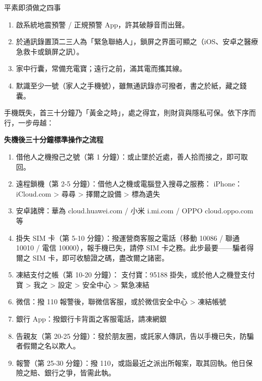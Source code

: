 \begin{tcbpractice}{平素即須做之四事}
\begin{enumerate}
  \item 啟系統地震預警 / 正規預警 App，許其破靜音而出聲。
  \item 於通訊錄置頂二三人為「緊急聯絡人」，鎖屏之界面可顯之（iOS、安卓之醫療急救卡或鎖屏之訊）。
  \item 家中行囊，常備充電寶；遠行之前，滿其電而攜其線。
  \item 默識至少一號（家人之手機號），雖無通訊錄亦可撥者，書之於紙，藏之錢囊。
\end{enumerate}

\end{tcbpractice}


手機既失，首三十分鐘乃「黃金之時」，處之得宜，則財貨與隱私可保。依下序而行，一步毋越：

\textbf{失機後三十分鐘標準操作之流程}\par

\begin{enumerate}
  \item 借他人之機撥己之號（第 1 分鐘）：或止墜於近處，善人拾而接之，即可取回。
  \item 遠程鎖機（第 2-5 分鐘）：借他人之機或電腦登入搜尋之服務： iPhone：iCloud.com > 尋尋 > 擇爾之設備 > 標為遺失
  \item 安卓諸牌：華為 cloud.huawei.com / 小米 i.mi.com / OPPO cloud.oppo.com 等
  \item 掛失 SIM 卡（第 5-10 分鐘）：撥運營商客服之電話（移動 10086 / 聯通 10010 / 電信 10000），報手機已失，請停 SIM 卡之務。此步最要——騙者得爾之 SIM 卡，即可收驗證之碼，盡改爾之諸密。
  \item 凍結支付之帳（第 10-20 分鐘）： 支付寶：95188 掛失，或於他人之機登支付寶 > 我之 > 設定 > 安全中心 > 緊急凍結
  \item 微信：撥 110 報警後，聯微信客服，或於微信安全中心 > 凍結帳號
  \item 銀行 App：撥銀行卡背面之客服電話，請凍網銀
  \item 告親友（第 20-25 分鐘）：發於朋友圈，或託家人傳訊，告以手機已失，防騙者假爾之名以欺人。
  \item 報警（第 25-30 分鐘）：撥 110，或詣最近之派出所報案，取其回執。他日保險之賠、銀行之爭，皆需此執。
\end{enumerate}


